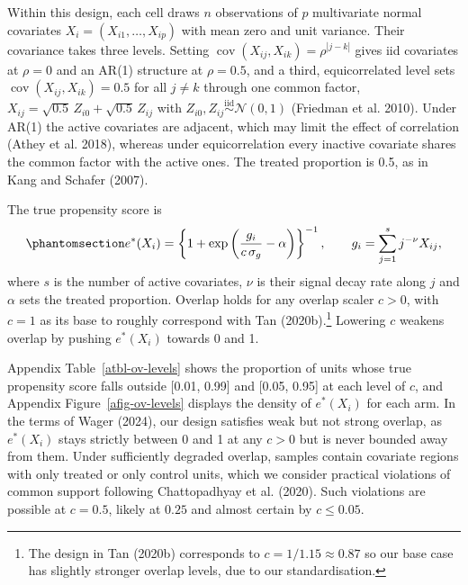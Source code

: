 \documentclass[
  12pt,
  a4paper,
]{article}
\begin{document}
Within this design, each cell draws \(n\) observations of \(p\)
multivariate normal covariates \(X_i = (X_{i1}, \ldots, X_{ip})\) with
mean zero and unit variance. Their covariance takes three levels.
Setting \(\operatorname{cov}(X_{ij}, X_{ik}) = \rho^{|j-k|}\) gives iid
covariates at \(\rho = 0\) and an AR(1) structure at \(\rho = 0.5\), and
a third, equicorrelated level sets
\(\operatorname{cov}(X_{ij}, X_{ik}) = 0.5\) for all \(j \neq k\)
through one common factor,
\(X_{ij} = \sqrt{0.5}\,Z_{i0} + \sqrt{0.5}\,Z_{ij}\) with
\(Z_{i0}, Z_{ij} \overset{\text{iid}}{\sim} \mathcal{N}(0, 1)\)
(Friedman et al. 2010). Under AR(1) the active covariates are adjacent,
which may limit the effect of correlation (Athey et al. 2018), whereas
under equicorrelation every inactive covariate shares the common factor
with the active ones. The treated proportion is 0.5, as in Kang and
Schafer (2007).

The true propensity score is
\begin{equation}\protect\phantomsection\label{eq-score}{e^*(X_i) = \left\{1 + \exp\left(\frac{g_i}{c\,\sigma_g} - \alpha\right)\right\}^{-1},
\qquad g_i = \sum_{j=1}^{s} j^{-\nu} X_{ij},}\end{equation} where \(s\)
is the number of active covariates, \(\nu\) is their signal decay rate
along \(j\) and \(\alpha\) sets the treated proportion. Overlap holds
for any overlap scaler \(c > 0\), with \(c = 1\) as its base to roughly
correspond with Tan (2020b).\footnote{The design in Tan (2020b)
  corresponds to \(c = 1/1.15 \approx 0.87\) so our base case has
  slightly stronger overlap levels, due to our standardisation.}
Lowering \(c\) weakens overlap by pushing \(e^*(X_i)\) towards 0 and 1.

Appendix Table~\ref{atbl-ov-levels} shows the proportion of units whose
true propensity score falls outside {[}0.01, 0.99{]} and {[}0.05,
0.95{]} at each level of \(c\), and Appendix Figure~\ref{afig-ov-levels}
displays the density of \(e^*(X_i)\) for each arm. In the terms of Wager
(2024), our design satisfies weak but not strong overlap, as
\(e^*(X_i)\) stays strictly between 0 and 1 at any \(c > 0\) but is
never bounded away from them. Under sufficiently degraded overlap,
samples contain covariate regions with only treated or only control
units, which we consider practical violations of common support
following Chattopadhyay et al. (2020). Such violations are possible at
\(c=0.5\), likely at \(0.25\) and almost certain by \(c \le 0.05\).
\end{document}
